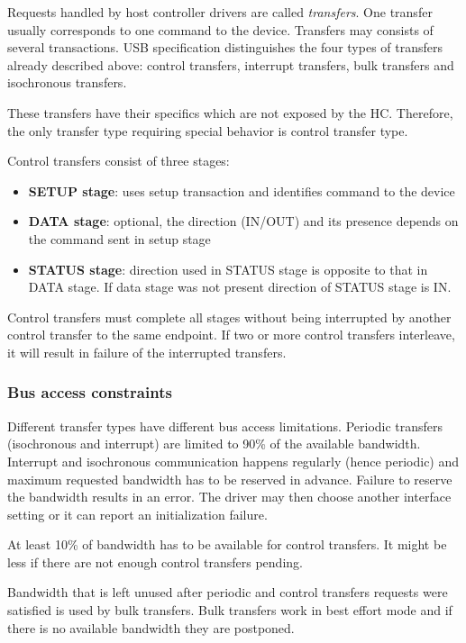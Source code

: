 Requests handled by host controller drivers are called \textit{transfers}. One
transfer usually corresponds to one command to the device. Transfers may
consists of several transactions. USB specification distinguishes the four
types of transfers already described above: control transfers, interrupt
transfers, bulk transfers and isochronous transfers.

These transfers have their specifics which are not exposed by the HC.
Therefore, the only transfer type requiring special behavior is control
transfer type.

Control transfers consist of three stages:
\begin{itemize}
\item \textbf{SETUP stage}: uses setup transaction and identifies command to
the device
\item \textbf{DATA stage}: optional, the direction (IN/OUT) and its presence
depends on the command sent in setup stage
\item \textbf{STATUS stage}: direction used in STATUS stage is opposite to that
in DATA stage. If data stage was not present direction of STATUS stage is IN.
\end{itemize}

Control transfers must complete all stages without being interrupted by another
control transfer to the same endpoint. If two or more control transfers
interleave, it will result in failure of the interrupted transfers.

\subsubsection{Bus access constraints}

Different transfer types have different bus access limitations. Periodic
transfers (isochronous and interrupt) are limited to 90\% of the available
bandwidth. Interrupt and isochronous communication happens regularly (hence
periodic) and maximum requested bandwidth has to be reserved in advance.
Failure to reserve the bandwidth results in an error. The driver may then
choose another interface setting or it can report an initialization failure.

At least 10\% of bandwidth has to be available for control transfers. It might
be less if there are not enough control transfers pending.

Bandwidth that is left unused after periodic and control transfers requests
were satisfied is used by bulk transfers. Bulk transfers work in best effort
mode and if there is no available bandwidth they are postponed.

